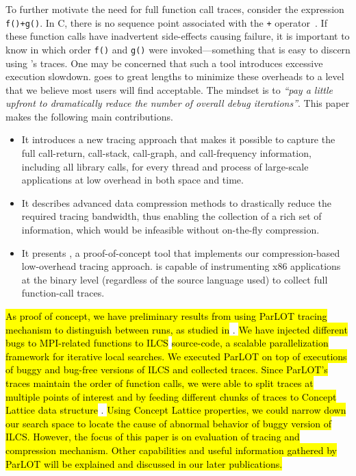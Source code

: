 To further motivate the need for full function call
traces, consider the expression {\tt f()+g()}.
%
In C, there is no sequence point associated with the {\tt +}
operator~\cite{sequence-points-in-C}.
%
If these function calls have inadvertent side-effects causing 
failure, it is important to know in which order {\tt f()}
and {\tt g()} were invoked---something that is easy to discern using
\parlot 's traces.
%
One may be concerned that such a tool introduces excessive execution slowdown.
%
\parlot goes to great lengths to minimize these overheads to a level that we believe most users will find acceptable. The mindset is to \textit{``pay a little upfront to dramatically reduce the number of overall debug iterations''}. 
%
This paper makes the following main contributions.
%
\begin{itemize}
\item It introduces a new tracing approach that makes it possible to capture the full call-return, call-stack, call-graph, and call-frequency information, including all library calls, for every thread and process of large-scale applications at low overhead in both space and time.
\item It describes advanced data compression methods to drastically reduce the required tracing bandwidth, thus enabling the collection of a rich set of information, which would be infeasible without on-the-fly compression.
\item It presents \parlot, a proof-of-concept tool that implements our compression-based low-overhead tracing approach. \parlot is capable of instrumenting x86 applications at the binary level (regardless of the source language used) to collect full function-call traces.
\end{itemize}
%
\hl{As proof of concept, we have preliminary results from using ParLOT tracing mechanism to distinguish between runs, as studied in} \citep{cstg}. \hl{We have injected different bugs to MPI-related functions to ILCS} \cite{ilcs} \hl{source-code, a scalable parallelization framework for iterative local searches. We executed ParLOT on top of executions of buggy and bug-free versions of ILCS and collected traces.
Since ParLOT's traces maintain the order of function calls, we were able to split traces at multiple points of interest and by feeding different chunks of traces to Concept Lattice data structure} \cite{clbook} \cite{clconst}. 
\hl{Using Concept Lattice properties, we could narrow down our search space to locate the cause of abnormal behavior of buggy version of ILCS. However, the focus of this paper is on evaluation of tracing and compression mechanism.
Other capabilities and useful information gathered by ParLOT will be explained and discussed in our later publications.}

